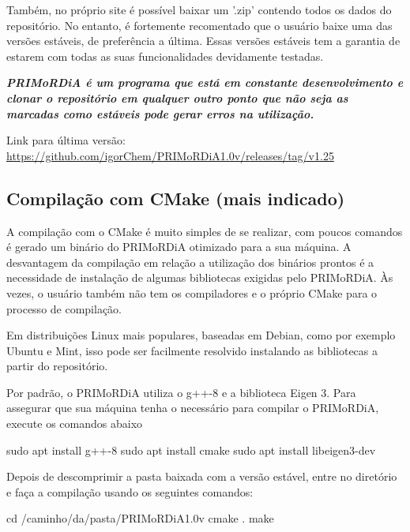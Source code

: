 \documentclass[a4paper,11pt]{refart}
\begin{document}
Também, no próprio site é possível baixar um '.zip' contendo todos os dados do repositório. 
No entanto, é fortemente recomentado que o usuário baixe uma das versões estáveis, de preferência a última. Essas versões estáveis tem a garantia de estarem com todas as suas funcionalidades devidamente testadas. 

\emph{\textbf{PRIMoRDiA é um programa que está em constante desenvolvimento e clonar o repositório em qualquer outro ponto que não seja as marcadas como estáveis pode gerar erros na utilização. }}

Link para última versão: \url{https://github.com/igorChem/PRIMoRDiA1.0v/releases/tag/v1.25}

\subsection{ Compilação com CMake (mais indicado) }

A compilação com o CMake é muito simples de se realizar, com poucos comandos é gerado um binário do PRIMoRDiA otimizado para a sua máquina. A desvantagem da compilação em relação a utilização dos binários prontos é a necessidade de instalação de algumas bibliotecas exigidas pelo PRIMoRDiA. Às vezes, o usuário também não tem os compiladores e o próprio CMake para o processo de compilação. 

Em distribuições Linux mais populares, baseadas em Debian, como por exemplo Ubuntu e Mint, isso pode ser facilmente resolvido instalando as bibliotecas a partir do repositório.

Por padrão, o PRIMoRDiA utiliza o g++-8 e a biblioteca Eigen 3. Para assegurar que sua máquina tenha o necessário para compilar o PRIMoRDiA, execute os comandos abaixo

\hspace*{-\leftmarginwidth}
\begin{minipage}{\fullwidth}
\begin{commandshell}
sudo apt install g++-8 
sudo apt install cmake
sudo apt install libeigen3-dev
\end{commandshell}
\end{minipage}
 
Depois de descomprimir a pasta baixada com a versão estável, entre no diretório e faça a compilação usando os seguintes comandos: 

\hspace*{-\leftmarginwidth}
\begin{minipage}{\fullwidth}
\begin{commandshell}cd /caminho/da/pasta/PRIMoRDiA1.0v
cmake .
make
\end{commandshell}
\end{minipage}
\end{document}
